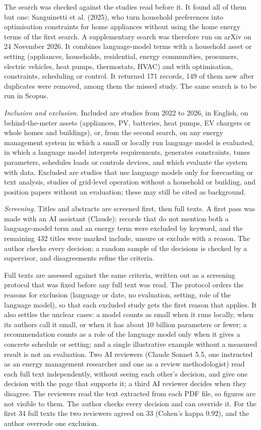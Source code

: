 \documentclass[12pt,a4paper]{report}
\begin{document}
The search was checked against the studies read before it. It found
all of them but one: Sanguinetti et al. (2025), who turn household
preferences into optimisation constraints for home appliances without
using the home energy terms of the first search. A supplementary search
was therefore run on arXiv on 24 November 2026. It combines
language-model terms with a household asset or setting (appliances,
households, residential, energy communities, prosumers, electric
vehicles, heat pumps, thermostats, HVAC) and with optimisation,
constraints, scheduling or control. It returned 171 records, 149 of them
new after duplicates were removed, among them the missed study. The same
search is to be run in Scopus.

\textit{Inclusion and exclusion.} Included are studies from 2022 to
2026, in English, on behind-the-meter assets (appliances, PV, batteries,
heat pumps, EV chargers or whole homes and buildings), or, from the
second search, on any energy management system in which a small or
locally run language model is evaluated, in which a
language model interprets requirements, generates constraints, tunes
parameters, schedules loads or controls devices, and which evaluate the
system with data. Excluded are studies that use language models only for
forecasting or text analysis, studies of grid-level operation without a
household or building, and position papers without an evaluation; these
may still be cited as background.

\textit{Screening.} Titles and abstracts are screened
first, then full texts. A first pass was made with an AI assistant
(Claude): records that do not mention both a language-model term and an
energy term were excluded by keyword, and the remaining 432 titles were
marked include, unsure or exclude with a reason. The author checks every
decision; a random sample of the decisions is checked by a supervisor,
and disagreements refine the criteria.

Full texts are assessed against the same criteria, written out as a
screening protocol that was fixed before any full text was read. The
protocol orders the reasons for exclusion (language or date, no
evaluation, setting, role of the language model), so that each excluded
study gets the first reason that applies. It also settles the unclear
cases: a model counts as small when it runs locally, when its authors
call it small, or when it has about 10 billion parameters or fewer; a
recommendation counts as a role of the language model only when it
gives a concrete schedule or setting; and a single illustrative example
without a measured result is not an evaluation. Two AI reviewers (Claude
Sonnet 5.5, one instructed as an energy management researcher and one as
a review methodologist) read each full text independently, without
seeing each other's decision, and give one decision with the page that
supports it; a third AI reviewer decides when they disagree. The
reviewers read the text extracted from each PDF file, so figures are not
visible to them. The author checks every decision and can override it.
For the first 34 full texts the two reviewers agreed on 33 (Cohen's
kappa 0.92), and the author overrode one exclusion.
\end{document}
